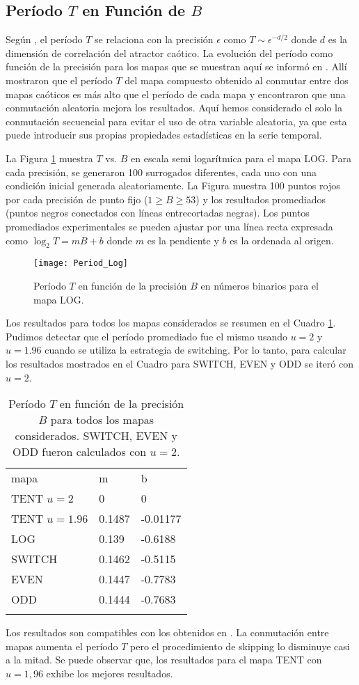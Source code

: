 \subsection{Período $T$ en Función de $B$}

Según \cite{Grebogi1988}, el período $T$ se relaciona con la precisión $\epsilon$ como $T \sim \epsilon^{-d/2}$ donde $d$ es la dimensión de correlación del atractor caótico.
La evolución del período como función de la precisión para los mapas que se muestran aquí se informó en \cite{Nagaraj2008}.
Allí mostraron que el período $T$ del mapa compuesto obtenido al conmutar entre dos mapas caóticos es más alto que el período de cada mapa y encontraron que una conmutación aleatoria mejora los resultados.
Aquí hemos considerado el solo la conmutación secuencial para evitar el uso de otra variable aleatoria, ya que esta puede introducir sus propias propiedades estadísticas en la serie temporal.

La Figura \ref{fig:period} muestra $T$ vs. $B$ en escala semi logarítmica para el mapa LOG.
Para cada precisión, se generaron 100 surrogados diferentes, cada uno con una condición inicial generada aleatoriamente.
La Figura muestra 100 puntos rojos por cada precisión de punto fijo ($1 \geq B \geq 53$) y los resultados promediados (puntos negros conectados con líneas entrecortadas negras).
Los puntos promediados experimentales se pueden ajustar por una línea recta expresada como $\log_2 T = mB + b$ donde $m$ es la pendiente y $b$ es la ordenada al origen.
%
\begin{figure}[htpb]
\centering	
	\texttt{[image: Period\_Log]}
	\caption{Período $T$ en función de la precisión $B$ en números binarios para el mapa LOG.} \label{fig:period}
\end{figure}

Los resultados para todos los mapas considerados se resumen en el Cuadro \ref{tabla:periodos}.
Pudimos detectar que el período promediado fue el mismo usando $u=2$ y $u=1.96$ cuando se utiliza la estrategia de switching.
Por lo tanto, para calcular los resultados mostrados en el Cuadro para SWITCH, EVEN y ODD se iteró con $u=2$.
%
\begin{table}[htpb]
	\centering	
	\caption{Período $T$ en función de la precisión $B$ para todos los mapas considerados. SWITCH, EVEN y ODD fueron calculados con $u=2$.}
	\vspace{1em}
	\begin{tabular}{lll}
		\hline\noalign{\smallskip}
		mapa 			& m 	& b  \\
		\noalign{\smallskip}\hline\noalign{\smallskip}
		TENT $u=2$		&0 		& 0 \\
		TENT $u=1.96$ 	&0.1487 & -0.01177 \\
		LOG 			&0.139 	& -0.6188 \\
		SWITCH 			&0.1462 & -0.5115 \\
		EVEN 			&0.1447 & -0.7783 \\
		ODD 			&0.1444 & -0.7683 \\
		\noalign{\smallskip}\hline
	\end{tabular}
	\label{tabla:periodos}	
\end{table}

Los resultados son compatibles con los obtenidos en \cite{Nagaraj2008}.
La conmutación entre mapas aumenta el período $T$ pero el procedimiento de skipping lo disminuye casi a la mitad.
Se puede observar que, los resultados para el mapa TENT con $u=1,96$ exhibe los mejores resultados.